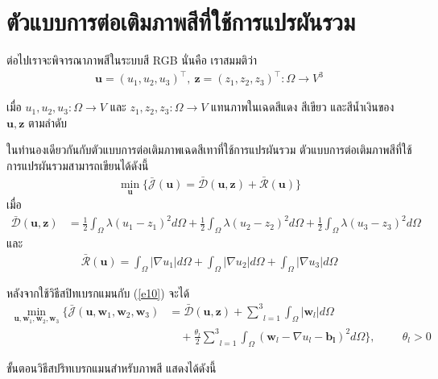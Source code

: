 \section{ตัวแบบการต่อเติมภาพสีที่ใช้การแปรผันรวม}\label{inpaint-model-color}

\hspace{1cm} ต่อไปเราจะพิจารณาภาพสีในระบบสี RGB นั่นคือ เราสมมติว่า	
\begin{align*}
	\boldsymbol{u} = (u_1,u_2,u_3)^{\top},\ \boldsymbol{z} = (z_1,z_2,z_3)^{\top} : \Omega  \rightarrow V^3
\end{align*}
	
\noindent เมื่อ $u_1,u_2,u_3: \Omega  \rightarrow V$ และ $z_1,z_2,z_3: \Omega  \rightarrow V$ แทนภาพในเฉดสีแดง สีเขียว และสีน้ำเงินของ $\boldsymbol{u},\boldsymbol{z}$ ตามลำดับ 
	
\hspace{1cm} ในทำนองเดียวกันกับตัวแบบการต่อเติมภาพเฉดสีเทาที่ใช้การแปรผันรวม ตัวแบบการต่อเติมภาพสีที่ใช้การแปรผันรวมสามารถเขียนได้ดังนี้
\begin{align}
	\min_{\boldsymbol{u}} \{ \bar{\mathcal{J}}(\boldsymbol{u})= \mathcal{\bar{D}}(\boldsymbol{u},\boldsymbol{z})+  \mathcal{\bar{R}}(\boldsymbol{u}) \}
	\label{e10}
\end{align}
เมื่อ
\begin{align*}
	\mathcal{\bar{D}}(\boldsymbol{u},\boldsymbol{z}) 
	&= \frac{1}{2}\int_{\Omega}^{}\lambda(u_1 - z_1)^2 d\Omega + \frac{1}{2}\int_{\Omega}^{}\lambda(u_2 - z_2)^2 d\Omega + \frac{1}{2}\int_{\Omega}^{}\lambda(u_3 - z_3)^2 d\Omega
\end{align*}
และ 
\begin{align*}
	\mathcal{\bar{R}}(\boldsymbol{u})= \int_{\Omega}^{}\lvert\nabla u_1 \rvert d\Omega + \int_{\Omega}^{}\lvert\nabla u_2 \rvert d\Omega + \int_{\Omega}^{}\lvert\nabla u_3 \rvert d\Omega
\end{align*}
	
\hspace{1cm}  หลังจากใช้วิธีสปิทเบรกแมนกับ (\ref{e10}) จะได้
\begin{align}
	\min_{\boldsymbol{u},\boldsymbol{w}_1,\boldsymbol{w}_2,\boldsymbol{w}_3} \{\bar{\mathcal{J}}(\boldsymbol{u},\boldsymbol{w}_1,\boldsymbol{w}_2,\boldsymbol{w}_3)&= \mathcal{\bar{D}}(\boldsymbol{u},\boldsymbol{z}) +  \underset{l=1}{\overset{3}{\sum}} \int_{\Omega}^{}|\boldsymbol{w}_l|d\Omega
	\nonumber\\
	&\quad+ \frac{\theta_l}{2} \underset{l=1}{\overset{3}{\sum}}\int_{\Omega}^{}(\boldsymbol{w}_l - \nabla u_l - \boldsymbol{b_l})^{2}d\Omega\}, \hspace{1cm} \theta_l > 0
\end{align}
	
\vspace{1cm}
\hspace{1cm}ขั้นตอนวิธีสปริทเบรกแมนสำหรับภาพสี แสดงได้ดังนี้ 


\vspace{0.5cm}

\vspace{1cm}

